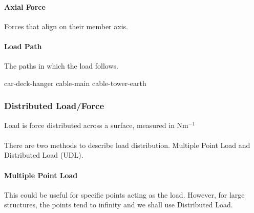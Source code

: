 \paragraph{Axial Force} Forces that align on their member axis. 
\paragraph{Load Path} The paths in which the load follows.
\begin{example}
    car-deck-hanger cable-main cable-tower-earth
\end{example}
\subsubsection{Distributed Load/Force}
\begin{definition}[load]
    Load is force distributed across a surface, measured in Nm$^{-1}$ 
\end{definition}
\paragraph{} There are two methods to describe load distribution. Multiple Point Load and Distributed Load (UDL).
\paragraph{Multiple Point Load} This could be useful for specific points acting as the load. However, for large structures, the points tend to infinity and we shall use Distributed Load.
\begin{center}
\end{center}
